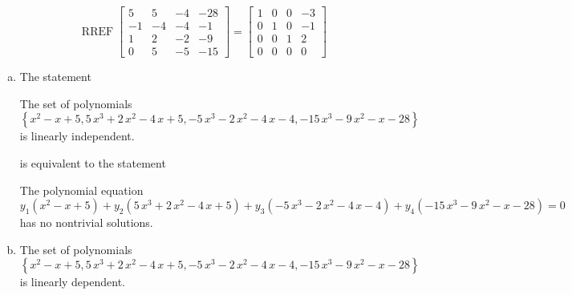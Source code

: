\begin{exerciseAnswer} 


\[\operatorname{RREF} \left[\begin{array}{cccc}
5 & 5 & -4 & -28 \\
-1 & -4 & -4 & -1 \\
1 & 2 & -2 & -9 \\
0 & 5 & -5 & -15
\end{array}\right] = \left[\begin{array}{cccc}
1 & 0 & 0 & -3 \\
0 & 1 & 0 & -1 \\
0 & 0 & 1 & 2 \\
0 & 0 & 0 & 0
\end{array}\right] \]


\begin{enumerate}[(a)]
\item The statement 
\begin{center}\begin{minipage}{0.8\textwidth}
 The set of polynomials \( \left\{ x^{2} - x + 5 , 5 \, x^{3} + 2 \, x^{2} - 4 \, x + 5 , -5 \, x^{3} - 2 \, x^{2} - 4 \, x - 4 , -15 \, x^{3} - 9 \, x^{2} - x - 28 \right\} \) is linearly independent.
\end{minipage}\end{center}
     is equivalent to the statement 
\begin{center}\begin{minipage}{0.8\textwidth}
 The polynomial equation \[ y_{1} \left( x^{2} - x + 5 \right) + y_{2} \left( 5 \, x^{3} + 2 \, x^{2} - 4 \, x + 5 \right) + y_{3} \left( -5 \, x^{3} - 2 \, x^{2} - 4 \, x - 4 \right) + y_{4} \left( -15 \, x^{3} - 9 \, x^{2} - x - 28 \right) = 0 \] has no nontrivial solutions. 
\end{minipage}\end{center}
    
\item The set of polynomials \( \left\{ x^{2} - x + 5 , 5 \, x^{3} + 2 \, x^{2} - 4 \, x + 5 , -5 \, x^{3} - 2 \, x^{2} - 4 \, x - 4 , -15 \, x^{3} - 9 \, x^{2} - x - 28 \right\} \)is linearly dependent.
\end{enumerate}
    
\end{exerciseAnswer}
    
